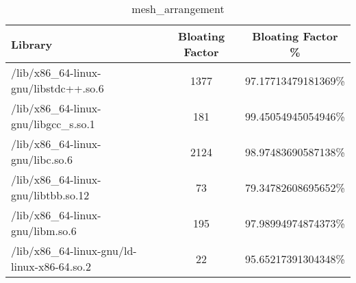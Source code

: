 \begin{table}[h]

\centering
\caption{mesh\_arrangement}
\footnotesize
\begin{tabular}{l|c|c}
\toprule
Library & Bloating Factor & Bloating Factor \% \\ \midrule
\colorbox{gray!20}{/lib/x86\_64-linux-gnu/libstdc++.so.6} & 1377 & 97.17713479181369\% \\ \hline
\colorbox{gray!20}{/lib/x86\_64-linux-gnu/libgcc\_s.so.1} & 181 & 99.45054945054946\% \\ \hline
\colorbox{gray!20}{/lib/x86\_64-linux-gnu/libc.so.6} & 2124 & 98.97483690587138\% \\ \hline
\colorbox{gray!20}{/lib/x86\_64-linux-gnu/libtbb.so.12} & 73 & 79.34782608695652\% \\ \hline
\colorbox{gray!20}{/lib/x86\_64-linux-gnu/libm.so.6} & 195 & 97.98994974874373\% \\ \hline
/lib/x86\_64-linux-gnu/ld-linux-x86-64.so.2 & 22 & 95.65217391304348\% \\ \hline
\bottomrule
\end{tabular}
\end{table}

